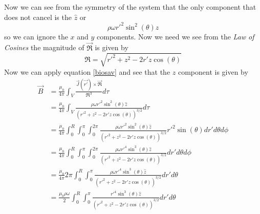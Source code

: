 \documentclass[11pt]{article}
\numberwithin{equation}{section}
\newcommand{\vecscrptR}{\vec{\mathfrak{R}}}
\newcommand{\scrptR}{\mathfrak{R}}
\begin{document}
Now we can see from the symmetry of the system that the only component that does not cancel is the $\hat{z}$ or
$$\rho\omega r'^2\sin^2(\theta)\hat{z}$$
so we can ignore the $x$ and $y$ components. Now we need we see from the \emph{Law of Cosines} the magnitude of $\vecscrptR$ is given by
$$\scrptR = \sqrt{r'^2+z^2-2r'z\cos(\theta)}$$
Now we can apply equation \ref{biosav} and see that the $z$ component is given by
\begin{align*}
\vec{B} &= \frac{\mu_0}{4\pi}\int_V\frac{\vec{J}(\vec{r'})\times\vecscrptR}{\scrptR^3}d\tau\\
&= \frac{\mu_0}{4\pi}\int_V\frac{\rho\omega r'^2\sin^2(\theta)\hat{z}}{(r'^2+z^2-2r'z\cos(\theta))^{3/2}}d\tau\\
&= \frac{\mu_0}{4\pi}\int_{0}^{R}\int_{0}^{\pi}\int_{0}^{2\pi}\frac{\rho\omega r'^2\sin^2(\theta)\hat{z}}{(r'^2+z^2-2r'z\cos(\theta))^{3/2}}r'^2\sin(\theta)dr'd\theta d\phi\\
&= \frac{\mu_0}{4\pi}\int_{0}^{R}\int_{0}^{\pi}\int_{0}^{2\pi}\frac{\rho\omega r'^4\sin^3(\theta)\hat{z}}{(r'^2+z^2-2r'z\cos(\theta))^{3/2}}dr'd\theta d\phi\\
&= \frac{\mu_0}{4\pi}2\pi\int_{0}^{R}\int_{0}^{\pi}\frac{\rho\omega r'^4\sin^3(\theta)\hat{z}}{(r'^2+z^2-2r'z\cos(\theta))^{3/2}}dr'd\theta\\
&= \frac{\mu_0\rho\omega}{2}\int_{0}^{R}\int_{0}^{\pi}\frac{ r'^4\sin^3(\theta)\hat{z}}{(r'^2+z^2-2r'z\cos(\theta))^{3/2}}dr'd\theta
\end{align*}
\end{document}
